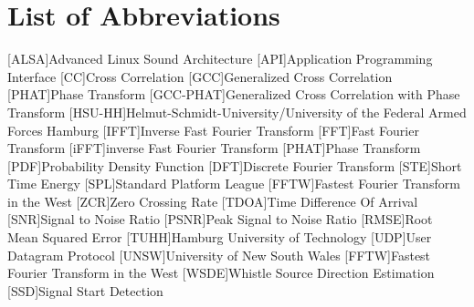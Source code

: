 \chapter*{List of Abbreviations}
\label{sec:abbreviations}

\begin{acronym}[HSU-HH]
  [ALSA]{Advanced Linux Sound Architecture}
  [API]{Application Programming Interface}
  [CC]{Cross Correlation}
  [GCC]{Generalized Cross Correlation}
  [PHAT]{Phase Transform}
  [GCC-PHAT]{Generalized Cross Correlation with Phase Transform}
  [HSU-HH]{Helmut-Schmidt-University/University of the Federal Armed Forces Hamburg}
  [IFFT]{Inverse Fast Fourier Transform}
  [FFT]{Fast Fourier Transform}
  [iFFT]{inverse Fast Fourier Transform}
  [PHAT]{Phase Transform}
  [PDF]{Probability Density Function}
  [DFT]{Discrete Fourier Transform}
  [STE]{Short Time Energy}
  [SPL]{Standard Platform League}
  [FFTW]{Fastest Fourier Transform in the West}
  [ZCR]{Zero Crossing Rate}
  [TDOA]{Time Difference Of Arrival}
  [SNR]{Signal to Noise Ratio}
  [PSNR]{Peak Signal to Noise Ratio}
  [RMSE]{Root Mean Squared Error}
  [TUHH]{Hamburg University of Technology}
  [UDP]{User Datagram Protocol}
  [UNSW]{University of New South Wales}
  [FFTW]{Fastest Fourier Transform in the West}
  [WSDE]{Whistle Source Direction Estimation}
  [SSD]{Signal Start Detection}
\end{acronym}
